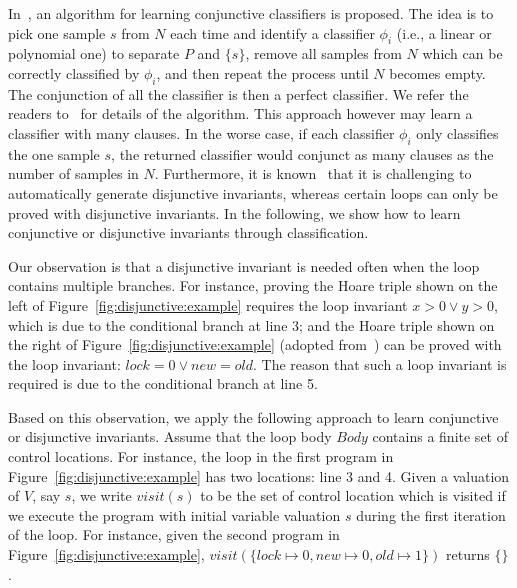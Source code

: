 In~\cite{sharma2012interpolants}, an algorithm for learning conjunctive classifiers is proposed. The idea is to pick one sample $s$ from $N$ each time and identify a classifier $\phi_i$ (i.e., a linear or polynomial one) to
separate $P$ and $\{s\}$, remove all samples from $N$ which can be correctly classified by $\phi_i$, and then repeat the process until $N$ becomes empty. The conjunction of all the classifier is then a perfect classifier. We refer the readers to~\cite{sharma2012interpolants} for details of the algorithm. This approach however may learn a classifier with many clauses. In the worse case, if each classifier $\phi_i$ only classifies the one sample $s$, the returned classifier would conjunct as many clauses as the number of samples in $N$. Furthermore, it is known~\cite{DBLP:conf/cav/SharmaDDA11,DBLP:conf/pldi/GulwaniSV08} that it is challenging to automatically generate disjunctive invariants, whereas certain loops can only be proved with disjunctive invariants. In the following, we show how to learn conjunctive or disjunctive invariants through classification. 

Our observation is that a disjunctive invariant is needed often when the loop contains multiple branches. For instance, proving the Hoare triple shown on the left of Figure~\ref{fig:disjunctive:example} requires the loop invariant $x > 0 \lor y > 0$, which is due to the conditional branch at line 3; and the Hoare triple shown on the right of Figure~\ref{fig:disjunctive:example} (adopted from~\cite{DBLP:conf/popl/HenzingerJMS02}) can be proved with the loop invariant: $lock = 0 \lor new = old$. The reason that such a loop invariant is required is due to the conditional branch at line 5.
 
 Based on this observation, we apply the following approach to learn conjunctive or disjunctive invariants. Assume that the loop body $Body$ contains a finite set of control locations. For instance, the loop in the first program in Figure~\ref{fig:disjunctive:example} has two locations: line 3 and 4. Given a valuation of $V$, say $s$, we write $visit(s)$ to be the set of control location which is visited if we execute the program with initial variable valuation $s$ during the first iteration of the loop. For instance, given the second program in Figure~\ref{fig:disjunctive:example}, $visit(\{lock \mapsto 0, new \mapsto 0, old \mapsto 1\})$ returns $\{\}$.



